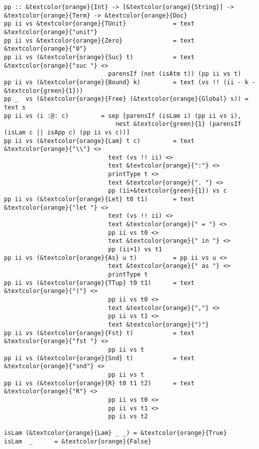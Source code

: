\documentclass[12pt, a4paper]{article}
\begin{document}
\begin{Verbatim}[commandchars=\&\{\}]
pp :: &textcolor{orange}{Int} -> [&textcolor{orange}{String}] -> &textcolor{orange}{Term} -> &textcolor{orange}{Doc}
pp ii vs &textcolor{orange}{TUnit}             = text &textcolor{orange}{"unit"}
pp ii vs &textcolor{orange}{Zero}              = text &textcolor{orange}{"0"}
pp ii vs (&textcolor{orange}{Suc} t)           = text &textcolor{orange}{"suc "} <>
                             parensIf (not (isAtm t)) (pp ii vs t)
pp ii vs (&textcolor{orange}{Bound} k)         = text (vs !! (ii - k - &textcolor{green}{1}))
pp _  vs (&textcolor{orange}{Free} (&textcolor{orange}{Global} s)) = text s
pp ii vs (i :@: c)         = sep [parensIf (isLam i) (pp ii vs i), 
                               nest &textcolor{green}{1} (parensIf (isLam c || isApp c) (pp ii vs c))]  
pp ii vs (&textcolor{orange}{Lam} t c)         = text &textcolor{orange}{"\\"} <>
                             text (vs !! ii) <>
                             text &textcolor{orange}{":"} <>
                             printType t <>
                             text &textcolor{orange}{". "} <> 
                             pp (ii+&textcolor{green}{1}) vs c
pp ii vs (&textcolor{orange}{Let} t0 t1)       = text &textcolor{orange}{"let "} <>
                             text (vs !! ii) <>
                             text &textcolor{orange}{" = "} <>
                             pp ii vs t0 <>
                             text &textcolor{orange}{" in "} <>
                             pp (ii+1) vs t1
pp ii vs (&textcolor{orange}{As} u t)          = pp ii vs u <>
                             text &textcolor{orange}{" as "} <>
                             printType t
pp ii vs (&textcolor{orange}{TTup} t0 t1)      = text &textcolor{orange}{"("} <>
                             pp ii vs t0 <>
                             text &textcolor{orange}{","} <>
                             pp ii vs t1 <>
                             text &textcolor{orange}{")"}
pp ii vs (&textcolor{orange}{Fst} t)           = text &textcolor{orange}{"fst "} <>
                             pp ii vs t
pp ii vs (&textcolor{orange}{Snd} t)           = text &textcolor{orange}{"snd"} <>
                             pp ii vs t
pp ii vs (&textcolor{orange}{R} t0 t1 t2)      = text &textcolor{orange}{"R"} <>
                             pp ii vs t0 <>
                             pp ii vs t1 <>
                             pp ii vs t2
                                                         
isLam (&textcolor{orange}{Lam} _ _) = &textcolor{orange}{True}
isLam  _      = &textcolor{orange}{False}
   

\end{Verbatim}
\end{document}

